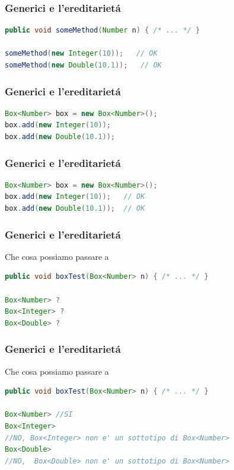 \documentclass{beamer}
\begin{document}
\begin{frame}[fragile]
\frametitle{Generici e l'ereditariet\'a}
\begin{framed}
\begin{lstlisting}[language=Java]
public void someMethod(Number n) { /* ... */ }

someMethod(new Integer(10));   // OK
someMethod(new Double(10.1));   // OK
\end{lstlisting}
\end{framed}
\end{frame}

\begin{frame}[fragile]
\frametitle{Generici e l'ereditariet\'a}
\begin{framed}
\begin{lstlisting}[language=Java]
Box<Number> box = new Box<Number>();
box.add(new Integer(10));   
box.add(new Double(10.1));  
\end{lstlisting}
\end{framed}
\end{frame}

\begin{frame}[fragile]
\frametitle{Generici e l'ereditariet\'a}
\begin{framed}
\begin{lstlisting}[language=Java]
Box<Number> box = new Box<Number>();
box.add(new Integer(10));   // OK
box.add(new Double(10.1));  // OK
\end{lstlisting}
\end{framed}
\end{frame}

\begin{frame}[fragile]
\frametitle{Generici e l'ereditariet\'a}
Che cosa possiamo passare a
\begin{framed}
\begin{lstlisting}[language=Java]
public void boxTest(Box<Number> n) { /* ... */ }

Box<Number> ?
Box<Integer> ?
Box<Double> ?
\end{lstlisting}
\end{framed}
\end{frame}

\begin{frame}[fragile]
\frametitle{Generici e l'ereditariet\'a}
Che cosa possiamo passare a
\begin{framed}
\begin{lstlisting}[language=Java]
public void boxTest(Box<Number> n) { /* ... */ }

Box<Number> //SI
Box<Integer>
//NO, Box<Integer> non e' un sottotipo di Box<Number>
Box<Double> 
//NO,  Box<Double> non e' un sottotipo di Box<Number>
\end{lstlisting}
\end{framed}
\end{frame}
\end{document}
